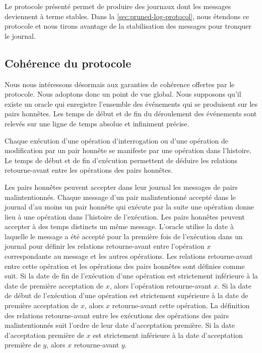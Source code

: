 Le protocole présenté permet de produire des journaux dont les messages deviennent à terme stables.
Dans la \autoref{sec:pruned-log-protocol}, nous étendons ce protocole et nous tirons avantage de la stabilisation des messages pour tronquer le journal.


\subsection{Cohérence du protocole}

Nous nous intéressons désormais aux garanties de cohérence offertes par le protocole.
Nous adoptons donc un point de vue global.
Nous supposons qu'il existe un oracle qui enregistre l'ensemble des événements qui se produisent sur les pairs honnêtes.
Les temps de début et de fin du déroulement des événements sont relevés sur une ligne de temps absolue et infiniment précise.

Chaque exécution d'une opération d'interrogation ou d'une opération de modification par un pair honnête se manifeste par une opération dans l'histoire.
Le temps de début et de fin d'exécution permettent de déduire les relations retourne-avant entre les opérations des pairs honnêtes.

Les pairs honnêtes peuvent accepter dans leur journal les messages de pairs malintentionnés.
Chaque message d'un pair malintentionné accepté dans le journal d'au moins un pair honnête qui exécute par la suite une opération donne lieu à une opération dans l'histoire de l'exécution.
Les pairs honnêtes peuvent accepter à des temps distincts un même message.
L'oracle utilise la date à laquelle le message a été accepté pour la première fois de l'exécution dans un journal pour définir les relations retourne-avant entre l'opération $x$ correspondante au message et les autres opérations.
Les relations retourne-avant entre cette opération et les opérations des pairs honnêtes sont définies comme suit.
Si la date de fin de l'exécution d'une opération est strictement inférieure à la date de première acceptation de $x$, alors l'opération retourne-avant $x$.
Si la date de début de l'exécution d'une opération est strictement supérieure à la date de première acceptation de $x$, alors $x$ retourne-avant cette opération.
La définition des relations retourne-avant entre les exécutions des opérations des pairs malintentionnés suit l'ordre de leur date d'acceptation première.
Si la date d'acceptation première de $x$ est strictement inférieure à la date d'acceptation première de $y$, alors $x$ retourne-avant $y$.

